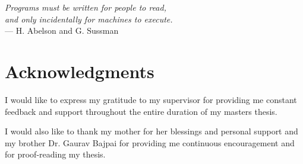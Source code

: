 
\begin{flushright}{\slshape
    Programs must be written for people to read, \\
    and only incidentally for machines to execute.} \\ \medskip
    --- H. Abelson and G. Sussman
\end{flushright}

\bigskip

\begingroup
\let\clearpage\relax
\let\cleardoublepage\relax
\let\cleardoublepage\relax
\chapter*{Acknowledgments}

I would like to express my gratitude to my supervisor \myProf for providing me
constant feedback and support throughout the entire duration of my masters
thesis.

I would also like to thank my mother for her blessings and personal support
and my brother Dr. Gaurav Bajpai for providing me continuous encouragement and
for proof-reading my thesis. \\

\endgroup
